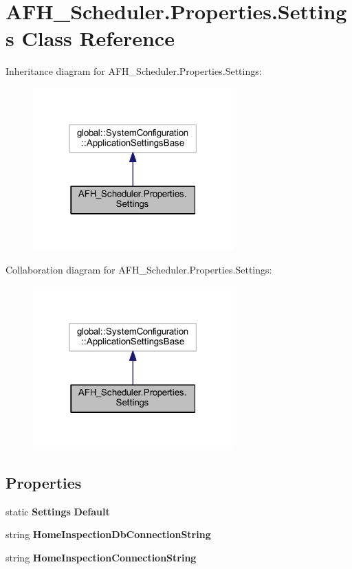 \section{A\+F\+H\+\_\+\+Scheduler.\+Properties.\+Settings Class Reference}
\label{class_a_f_h___scheduler_1_1_properties_1_1_settings}


Inheritance diagram for A\+F\+H\+\_\+\+Scheduler.\+Properties.\+Settings\+:
\nopagebreak
\begin{figure}[H]
\begin{center}
\leavevmode
\includegraphics[width=218pt]{class_a_f_h___scheduler_1_1_properties_1_1_settings__inherit__graph}
\end{center}
\end{figure}


Collaboration diagram for A\+F\+H\+\_\+\+Scheduler.\+Properties.\+Settings\+:
\nopagebreak
\begin{figure}[H]
\begin{center}
\leavevmode
\includegraphics[width=218pt]{class_a_f_h___scheduler_1_1_properties_1_1_settings__coll__graph}
\end{center}
\end{figure}
\subsection*{Properties}
\begin{DoxyCompactItemize}
\item 
static \textbf{ Settings} \textbf{ Default}\hspace{0.3cm}{\ttfamily  [get]}
\item 
string \textbf{ Home\+Inspection\+Db\+Connection\+String}\hspace{0.3cm}{\ttfamily  [get]}
\item 
string \textbf{ Home\+Inspection\+Connection\+String}\hspace{0.3cm}{\ttfamily  [get]}
\end{DoxyCompactItemize}


